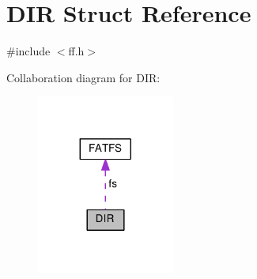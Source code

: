 \hypertarget{structDIR}{}\section{D\+IR Struct Reference}
\label{structDIR}


{\ttfamily \#include $<$ff.\+h$>$}



Collaboration diagram for D\+IR\+:\nopagebreak
\begin{figure}[H]
\begin{center}
\leavevmode
\includegraphics[width=128pt]{d2/d15/structDIR__coll__graph}
\end{center}
\end{figure}
